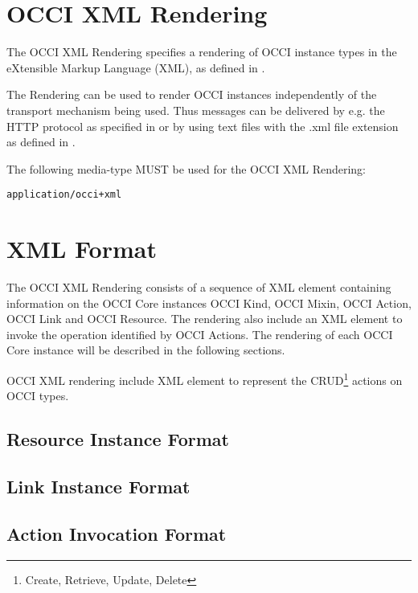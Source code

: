 \documentclass[10pt,a4paper]{article}
\begin{document}
\section{OCCI XML Rendering}

The OCCI XML Rendering specifies a rendering of OCCI instance types in
the eXtensible Markup Language (XML), as defined in \cite{w3c:xml11}.

The Rendering can be used to render OCCI instances independently of the
transport mechanism being used. Thus messages can be delivered by e.g. the HTTP
protocol as specified in \cite{occi:http_rendering} or by using text files with
the .xml file extension as defined in \cite{w3c:xml11}.

The following media-type MUST be used for the OCCI XML Rendering:

{\tt application/occi+xml}

\section{XML Format}
\label{sec:xml_format}

The OCCI XML Rendering consists of a sequence of XML element containing
information on the OCCI Core instances OCCI Kind, OCCI Mixin, OCCI
Action, OCCI Link and OCCI Resource. The rendering also include an XML
element to invoke the operation identified by OCCI Actions.
The rendering of each OCCI Core instance will be described in the
following sections.


OCCI XML rendering include XML element to represent the
CRUD\footnote{Create, Retrieve, Update, Delete} actions on OCCI types.

\subsection{Resource Instance Format}
\label{sec:format_resource}

\subsection{Link Instance Format}
\label{sec:format_link}

\subsection{Action Invocation Format}
\label{sec:format_action_invocation}
\end{document}
